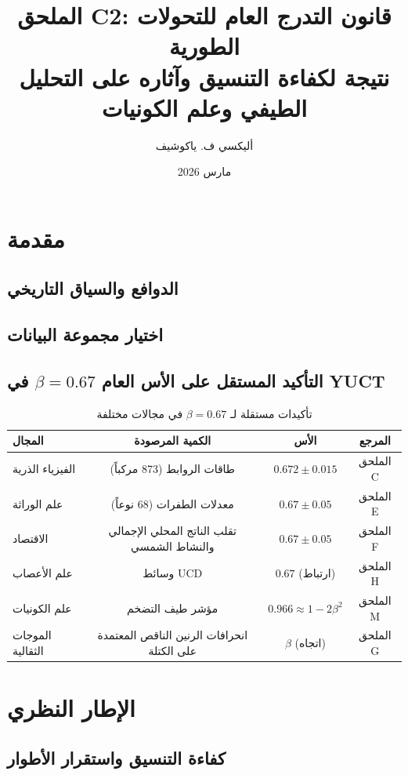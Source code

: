 \documentclass[11pt,a4paper]{article}
\title{الملحق C2: قانون التدرج العام للتحولات الطورية \\
	\large نتيجة لكفاءة التنسيق وآثاره على التحليل الطيفي وعلم الكونيات}
\author{أليكسي ف. ياكوشيف}
\date{مارس 2026}
\begin{document}
	
	\maketitle
	\tableofcontents
	
	\section{مقدمة}
	\subsection{الدوافع والسياق التاريخي}
	\subsection{اختيار مجموعة البيانات}
	\subsection{التأكيد المستقل على الأس العام \(\beta = 0.67\) في YUCT}
	
	\begin{table}[htbp]
		\centering
		\caption{تأكيدات مستقلة لـ \(\beta = 0.67\) في مجالات مختلفة}
		\label{tab:beta_confirmation}
		\begin{tabular}{@{}lccc@{}}
			\toprule
			\textbf{المجال} & \textbf{الكمية المرصودة} & \textbf{الأس} & \textbf{المرجع} \\
			\midrule
			الفيزياء الذرية & طاقات الروابط (873 مركباً) & \(0.672\pm0.015\) & الملحق C \\
			علم الوراثة & معدلات الطفرات (68 نوعاً) & \(0.67\pm0.05\) & الملحق E \\
			الاقتصاد & تقلب الناتج المحلي الإجمالي والنشاط الشمسي & \(0.67\pm0.05\) & الملحق F \\
			علم الأعصاب & وسائط UCD & \(0.67\) (ارتباط) & الملحق H \\
			علم الكونيات & مؤشر طيف التضخم & \(0.966 \approx 1-2\beta^2\) & الملحق M \\
			الموجات الثقالية & انحرافات الرنين الناقص المعتمدة على الكتلة & \(\beta\) (اتجاه) & الملحق G \\
			\bottomrule
		\end{tabular}
	\end{table}
	
	\section{الإطار النظري}
	\subsection{كفاءة التنسيق واستقرار الأطوار}
\end{document}
